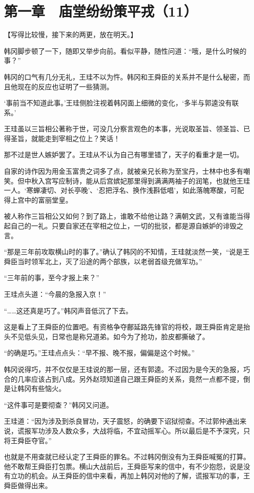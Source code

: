 \section{第一章　庙堂纷纷策平戎（11）}

【写得比较慢，接下来的两更，放在明天。】

韩冈脚步顿了一下，随即又举步向前。看似平静，随性问道：“哦，是什么时候的事？”

韩冈的口气有几分无礼，王珪不以为忤。韩冈和王舜臣的关系并不是什么秘密，而且他现在的反应也证明了一些猜测。

‘事前当不知道此事。’王珪侧脸注视着韩冈面上细微的变化，‘多半与郭逵没有联系。’

王珪虽以三旨相公著称于世，可没几分察言观色的本事，光说取圣旨、领圣旨、已得圣旨，就能走到宰相之位上？笑话！

那不过是世人嫉妒罢了。王珪从不认为自己有哪里错了，天子的看重才是一切。

自家的诗作因为用金玉富贵之词多了点，就被亲兄长称为至宝丹，士林中也多有嘲笑。但中秋入宫写应制诗，能从后宫嫔妃那里得到满满两袖子的润笔，也就他王珪一人。‘寒蝉凄切、对长亭晚’、‘忍把浮名、换作浅斟低唱’，如此落魄寒酸，可配得上宫中的富丽堂皇。

被人称作三旨相公又如何？到了路上，谁敢不给他让路？满朝文武，又有谁能当得起自己的一礼。只要自家还在宰相之位上，一切的批驳，都是源自嫉妒的诽毁之言。

“那是三年前攻取横山时的事了。”确认了韩冈的不知情，王珪就淡然一笑，“说是王舜臣当时领军北上，灭了沿途的两个部族，以老弱首级充做军功。”

“三年前的事，至今才报上来？”

王珪点头道：“今晨的急报入京！”

“……这还真是巧了。”韩冈声音低沉了下去。

这是看上了王舜臣的位置吧。有资格争夺鄜延路先锋官的将校，跟王舜臣肯定是抬头不见低头见，日常也是称兄道弟。如今为了抢功，脸皮都撕破了。

“的确是巧。”王珪点点头：“早不报、晚不报，偏偏是这个时候。”

韩冈说得巧，并不仅仅是王珪说的那一层，还有郭逵。不过因为是今天的急报，巧合的几率应该占到八成。另外赵顼知道自己跟王舜臣的关系，竟然一点都不提，倒是让韩冈有些恼火。

“这件事可是要彻查？”韩冈又问道。

王珪道：“因为涉及到杀良冒功，天子震怒，的确要下诏狱彻查。不过郭仲通出来说，谎报军功涉及人数众多，大战将临，不宜动摇军心。所以最后是不予深究，只将王舜臣夺官。”

也就是不用查就已经认定了王舜臣的罪名。不过韩冈倒没有为王舜臣喊冤的打算。他不敢帮王舜臣打包票。横山大战前后，王舜臣写来的信中，有不少抱怨，说是没有立功的机会。从王舜臣的信中来看，再加上韩冈对他的了解，谎报军功的事，王舜臣做得出来。

